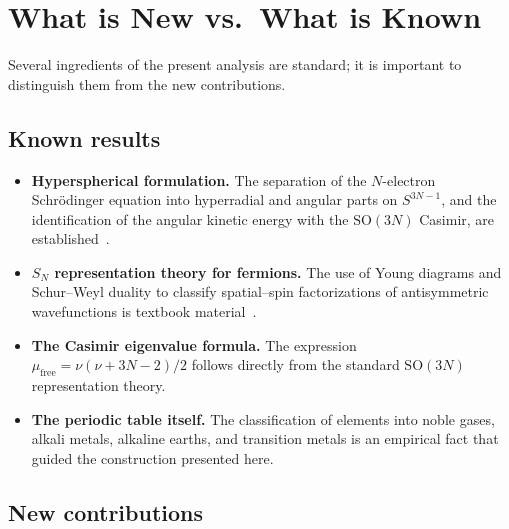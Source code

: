 \documentclass[aps,prl,twocolumn,superscriptaddress,longbibliography]{revtex4-2}
\newcommand{\mufree}{\mu_{\mathrm{free}}}
\begin{document}

\section{What is New vs.\ What is Known}
\label{sec:new_vs_known}

Several ingredients of the present analysis are standard; it is
important to distinguish them from the new contributions.

\subsection{Known results}

\begin{itemize}
  \item \textbf{Hyperspherical formulation.}  The separation of the
    $N$-electron Schr\"odinger equation into hyperradial and angular
    parts on $S^{3N-1}$, and the identification of the angular kinetic
    energy with the $\mathrm{SO}(3N)$ Casimir, are
    established~\cite{Avery2000, Fock1954}.

  \item \textbf{$S_N$ representation theory for fermions.}  The use of
    Young diagrams and Schur--Weyl duality to classify spatial--spin
    factorizations of antisymmetric wavefunctions is textbook
    material~\cite{Weyl1946, FultonHarris1991}.

  \item \textbf{The Casimir eigenvalue formula.}  The expression
    $\mufree = \nu(\nu + 3N - 2)/2$ follows directly from the
    standard $\mathrm{SO}(3N)$ representation theory.

  \item \textbf{The periodic table itself.}  The classification of
    elements into noble gases, alkali metals, alkaline earths, and
    transition metals is an empirical fact that guided the
    construction presented here.
\end{itemize}

\subsection{New contributions}
\end{document}
